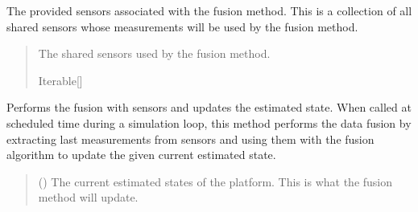 \documentclass[letterpaper,10pt,english]{sphinxmanual}
\begin{document}
\begin{fulllineitems}
\begin{fulllineitems}
\label{\detokenize{modules/measurement/sensor:qnav.measurement.sensor.SensorFusion.sensors}}
\pysigstartsignatures
{}
\pysigstopsignatures
\sphinxAtStartPar
The provided sensors associated with the fusion method.
This is a collection of all shared sensors whose measurements will be
used by the fusion method.
\begin{quote}\begin{description}
\sphinxAtStartPar
The shared sensors used by the fusion method.

\sphinxAtStartPar
Iterable{[}{\hyperref[\detokenize{modules/measurement/sensor:qnav.measurement.sensor.Sensor}]{}}{]}

\end{description}\end{quote}

\end{fulllineitems}


\begin{fulllineitems}
\label{\detokenize{modules/measurement/sensor:qnav.measurement.sensor.SensorFusion.perform_fusion}}
\pysigstartsignatures
{}
\pysigstopsignatures
\sphinxAtStartPar
Performs the fusion with sensors and updates the estimated state.
When called at scheduled time during a simulation loop, this method
performs the data fusion by extracting last measurements from sensors
and using them with the fusion algorithm to update the given current
estimated state.
\begin{quote}\begin{description}
\sphinxAtStartPar
{} ({\hyperref[\detokenize{modules/estimation/state:qnav.estimation.state.EstimatedState}]{}}) \textendash{} The current estimated states of the platform.
This is what the fusion method will update.

\end{description}\end{quote}

\end{fulllineitems}


\end{fulllineitems}
\end{document}
